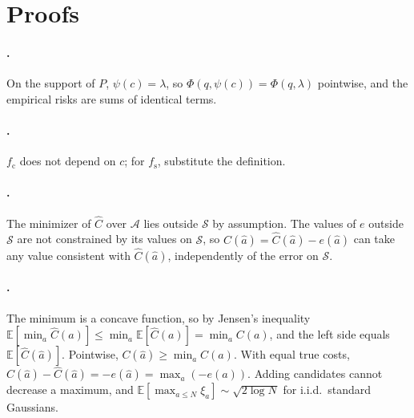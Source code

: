 \documentclass[11pt]{article}
\theoremstyle{definition}\newtheorem{definition}{Definition}
\newcommand{\E}{\mathbb{E}}
\newcommand{\supp}{\mathcal{S}}
\begin{document}



\newpage
\appendix
\section{Proofs}\label{app:proofs}
\paragraph{.} On the support of $P$, $\psi(c)=\lambda$, so $\Phi(q,\psi(c))=\Phi(q,\lambda)$ pointwise, and the empirical risks are sums of identical terms.
\paragraph{.} $f_{\mathrm c}$ does not depend on $c$; for $f_{\mathrm s}$, substitute the definition.
\paragraph{.} The minimizer of $\hat C$ over $\mathcal A$ lies outside $\supp$ by assumption. The values of $e$ outside $\supp$ are not constrained by its values on $\supp$, so $C(\hat a)=\hat C(\hat a)-e(\hat a)$ can take any value consistent with $\hat C(\hat a)$, independently of the error on $\supp$.
\paragraph{.} The minimum is a concave function, so by Jensen's inequality $\E[\min_a\hat C(a)]\le\min_a\E[\hat C(a)]=\min_aC(a)$, and the left side equals $\E[\hat C(\hat a)]$. Pointwise, $C(\hat a)\ge\min_aC(a)$. With equal true costs, $C(\hat a)-\hat C(\hat a)=-e(\hat a)=\max_a(-e(a))$. Adding candidates cannot decrease a maximum, and $\E[\max_{a\le N}\xi_a]\sim\sqrt{2\log N}$ for i.i.d.\ standard Gaussians.
\end{document}
